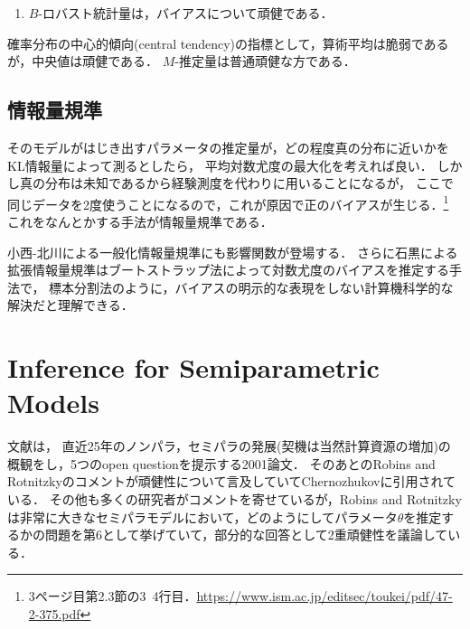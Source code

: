 \documentclass[uplatex,dvipdfmx]{jsreport}
\begin{document}
\begin{enumerate}
    \item $B$-ロバスト統計量は，バイアスについて頑健である．
\end{enumerate}

\begin{example}
    確率分布の中心的傾向(central tendency)の指標として，算術平均は脆弱であるが，中央値は頑健である．
    $M$-推定量は普通頑健な方である．
\end{example}

\subsection{情報量規準}

そのモデルがはじき出すパラメータの推定量が，どの程度真の分布に近いかをKL情報量によって測るとしたら，
平均対数尤度の最大化を考えれば良い．
しかし真の分布は未知であるから経験測度を代わりに用いることになるが，
ここで同じデータを2度使うことになるので，これが原因で正のバイアスが生じる．\footnote{3ページ目第2.3節の3~4行目．\url{https://www.ism.ac.jp/editsec/toukei/pdf/47-2-375.pdf}}
これをなんとかする手法が情報量規準である．

小西-北川による一般化情報量規準にも影響関数が登場する．
さらに石黒による拡張情報量規準はブートストラップ法によって対数尤度のバイアスを推定する手法で，
標本分割法のように，バイアスの明示的な表現をしない計算機科学的な解決だと理解できる．

\section{Inference for Semiparametric Models}

\begin{tcolorbox}[colframe=ForestGreen, colback=ForestGreen!10!white,breakable,colbacktitle=ForestGreen!40!white,coltitle=black,fonttitle=\bfseries\sffamily,
title=]
    文献\cite{Bickel-Kwon01-QandA}は，
    直近25年のノンパラ，セミパラの発展(契機は当然計算資源の増加)の概観をし，5つのopen questionを提示する2001論文．
    そのあとのRobins and Rotnitzkyのコメント\cite{Robins-Rotnitzky01-Comments}が頑健性について言及していてChernozhukovに引用されている．
    その他も多くの研究者がコメントを寄せているが，Robins and Rotnitzkyは非常に大きなセミパラモデルにおいて，どのようにしてパラメータ$\theta$を推定するかの問題を第6として挙げていて，部分的な回答として2重頑健性を議論している．

\end{tcolorbox}
\end{document}
